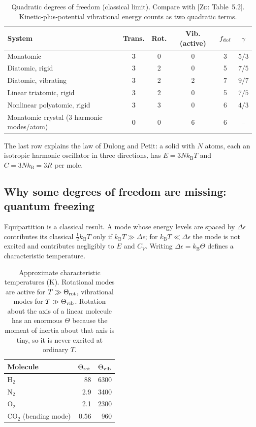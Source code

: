 \documentclass[11pt,a4paper]{report}
\theoremstyle{definition}
\theoremstyle{plain}
\newcommand{\ZD}[1]{[\textsc{Zd}: #1]}   %
\newcommand{\kB}{k_{\mathrm{B}}}
\begin{document}
\begin{table}[h]
\centering
\caption{Quadratic degrees of freedom (classical limit). Compare with \ZD{Table~5.2}. Kinetic-plus-potential vibrational energy counts as two quadratic terms.}
\label{tab:dof}
\begin{tabular}{@{}lccccc@{}}
\toprule
System & Trans. & Rot. & Vib. (active) & $f_{\rm dof}$ & $\gamma$\\
\midrule
Monatomic & 3 & 0 & 0 & 3 & $5/3$\\
Diatomic, rigid & 3 & 2 & 0 & 5 & $7/5$\\
Diatomic, vibrating & 3 & 2 & 2 & 7 & $9/7$\\
Linear triatomic, rigid & 3 & 2 & 0 & 5 & $7/5$\\
Nonlinear polyatomic, rigid & 3 & 3 & 0 & 6 & $4/3$\\
Monatomic crystal (3 harmonic modes/atom) & 0 & 0 & 6 & 6 & --\\
\bottomrule
\end{tabular}
\end{table}

The last row explains the law of Dulong and Petit: a solid with $N$ atoms, each an isotropic harmonic oscillator in three directions, has $E=3N\kB T$ and $C=3N\kB=3R$ per mole.

\subsection{Why some degrees of freedom are missing: quantum freezing}

Equipartition is a classical result. A mode whose energy levels are spaced by $\Delta\epsilon$ contributes its classical $\tfrac12\kB T$ only if $\kB T\gg\Delta\epsilon$; for $\kB T\ll\Delta\epsilon$ the mode is not excited and contributes negligibly to $E$ and $C_V$. Writing $\Delta\epsilon=\kB\Theta$ defines a characteristic temperature.

\begin{table}[h]
\centering
\caption{Approximate characteristic temperatures (K). Rotational modes are active for $T\gg\Theta_{\rm rot}$, vibrational modes for $T\gg\Theta_{\rm vib}$. Rotation about the axis of a linear molecule has an enormous $\Theta$ because the moment of inertia about that axis is tiny, so it is never excited at ordinary $T$.}
\label{tab:theta}
\begin{tabular}{@{}lrr@{}}
\toprule
Molecule & $\Theta_{\rm rot}$ & $\Theta_{\rm vib}$\\
\midrule
H$_2$ & 88 & 6300\\
N$_2$ & 2.9 & 3400\\
O$_2$ & 2.1 & 2300\\
CO$_2$ (bending mode) & 0.56 & 960\\
\bottomrule
\end{tabular}
\end{table}
\end{document}
